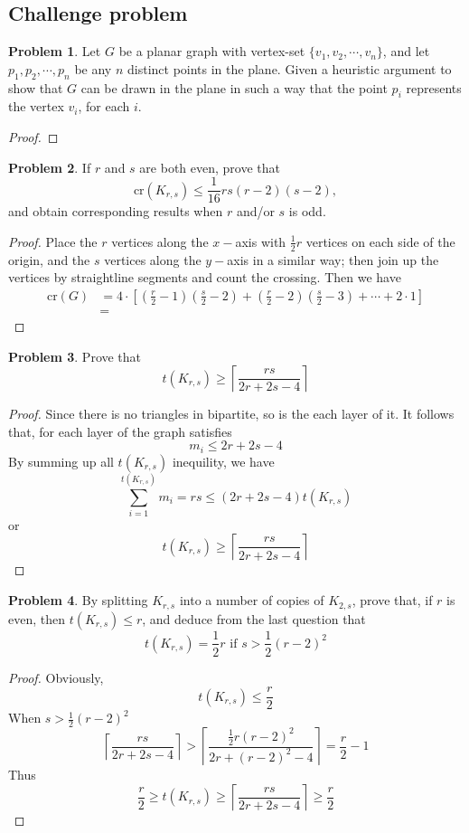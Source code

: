 \documentclass[a4paper,11pt]{article}%
\theoremstyle{remark}
\theoremstyle{definition}
\newtheorem{problem}{Problem}[subsection]
\begin{document}
\subsection{Challenge problem}
\begin{problem}
Let $G$ be a planar graph with vertex-set $\{v_1,v_2,\cdots,v_n\}$, and let $p_1,p_2,\cdots,p_n$ be any $n$ distinct points in the plane.
Given a heuristic argument to show that $G$ can be drawn in the plane in such a way that the point $p_i$ represents the vertex $v_i$, for each $i$.
\begin{proof}
\end{proof}
\end{problem}
\begin{problem}
    If $r$ and $s$ are both even, prove that 
    \[\text{cr}(K_{r,s})\leq\frac{1}{16}rs(r-2)(s-2),\]
    and obtain corresponding results when $r$ and/or $s$ is odd.
    \begin{proof}
        Place the $r$ vertices along the $x-$axis with $\frac{1}{2}r$ vertices on each side of the origin,
        and the $s$ vertices along the $y-$axis in a similar way; then join up the vertices by straightline segments and count the crossing.
        Then we have 
        \[\begin{array}{rl}
            \text{cr}(G)&=4\cdot[(\frac{r}{2}-1)(\frac{s}{2}-2)+(\frac{r}{2}-2)(\frac{s}{2}-3)+\cdots+2\cdot 1]\\
                        &=
        \end{array}
    \]        
    \end{proof}
\end{problem}
\begin{problem}
    Prove that 
    \[t(K_{r,s})\geq\left\lceil \frac{rs}{2r+2s-4}\right\rceil \]
    \begin{proof}
        Since there is no triangles in bipartite, so is the each layer of it.
        It follows that, for each layer of the graph satisfies
        \[m_i\leq 2r+2s-4\]
        By summing up all $t(K_{r,s})$ inequility, we have 
        \[\sum_{i=1}^{t(K_{r,s})}m_i=rs\leq (2r+2s-4)t(K_{r,s})\]
        or 
        \[ t(K_{r,s})\geq \left\lceil \frac{rs}{2r+2s-4}\right\rceil \]
    \end{proof}
\end{problem}
\begin{problem}
    By splitting $K_{r,s}$ into a number of copies of $K_{2,s}$, prove that, if $r$ is even, then $t(K_{r,s})\leq r$, 
    and deduce from the last question that  
    \[t(K_{r,s})=\frac{1}{2}r \text{ if } s>\frac{1}{2}(r-2)^2\]
    \begin{proof}
        Obviously,
        \[t(K_{r,s})\leq \frac{r}{2}\]
        When $s>\frac{1}{2}(r-2)^2$
        \[\left\lceil \frac{rs}{2r+2s-4}\right\rceil> \left\lceil \frac{\frac{1}{2}r(r-2)^2}{2r+(r-2)^2-4}\right\rceil=\frac{r}{2}-1   \]
        Thus 
        \[\frac{r}{2}\geq t(K_{r,s})\geq \left\lceil \frac{rs}{2r+2s-4}\right\rceil\geq \frac{r}{2} \]
    \end{proof}
\end{problem}
\end{document}
